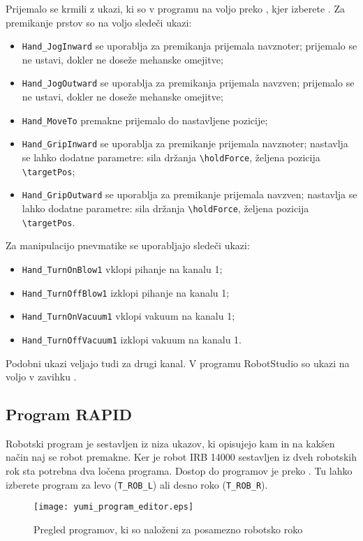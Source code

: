 Prijemalo se krmili z ukazi, ki so v programu na voljo preko , kjer izberete . Za premikanje prstov so na voljo sledeči ukazi:
\begin{itemize}
	\item \verb"Hand_JogInward" se uporablja za premikanja prijemala navznoter; prijemalo se ne ustavi, dokler ne doseže mehanske omejitve;
	\item \verb"Hand_JogOutward" se uporablja za premikanja prijemala navzven; prijemalo se ne ustavi, dokler ne doseže mehanske omejitve;
	\item \verb"Hand_MoveTo" premakne prijemalo do nastavljene pozicije;
	\item \verb"Hand_GripInward" se uporablja za premikanje prijemala navznoter; nastavlja se lahko dodatne parametre: sila držanja \verb"\holdForce", željena pozicija \verb"\targetPos";
	\item \verb"Hand_GripOutward" se uporablja za premikanje prijemala navzven; nastavlja se lahko dodatne parametre: sila držanja \verb"\holdForce", željena pozicija \verb"\targetPos".
\end{itemize}
Za manipulacijo pnevmatike se uporabljajo sledeči ukazi:
\begin{itemize}
	\item \verb"Hand_TurnOnBlow1" vklopi pihanje na kanalu 1;
	\item \verb"Hand_TurnOffBlow1" izklopi pihanje na kanalu 1;
	\item \verb"Hand_TurnOnVacuum1" vklopi vakuum na kanalu 1;
	\item \verb"Hand_TurnOffVacuum1" izklopi vakuum na kanalu 1.
\end{itemize}
Podobni ukazi veljajo tudi za drugi kanal. V programu RobotStudio so ukazi na voljo v zavihku .

\subsection{Program RAPID}

Robotski program je sestavljen iz niza ukazov, ki opisujejo kam in na kakšen način naj se robot premakne. Ker je robot IRB 14000 sestavljen iz dveh robotskih rok sta potrebna dva ločena programa. Dostop do programov je preko . Tu lahko izberete program za levo (\verb"T_ROB_L") ali desno roko (\verb"T_ROB_R").

\begin{figure}[!hbt]
	\centering
	\texttt{[image: yumi\_program\_editor.eps]}
	\caption{Pregled programov, ki so naloženi za posamezno robotsko roko}
	\label{fig:yumi_program_editor}
\end{figure}

